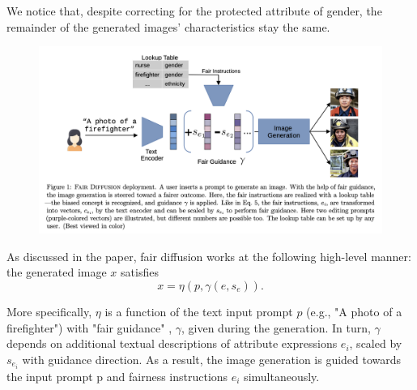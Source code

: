 \documentclass[12pt]{amsart}
\begin{document}
\setlength{}

We notice that, despite correcting for the protected attribute of gender, the remainder of the generated images' characteristics stay the same. 

\begin{figure}[H]
    \centering
\includegraphics[scale = 0.7]{FairDiffusion_Method.png}
    \label{fig:fairdiffusion_method}
\end{figure}

As discussed in the paper, fair diffusion works at the following high-level manner: the generated image $x$ satisfies
\[ x = \eta(p, \gamma(e, s_e)).\]

More specifically, $\eta$ is a function of the text input prompt $p$ (e.g., "A photo of a firefighter") with "fair guidance"
, $\gamma$, given during the generation. In turn, $\gamma$ depends on additional textual descriptions of attribute expressions $e_i$, scaled by $s_{e_i}$ with guidance direction. As a result, the image generation is guided towards the input prompt p
and fairness instructions $e_i$ simultaneously. \\
\end{document}

